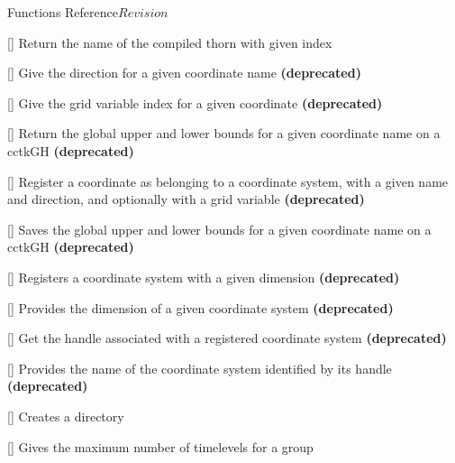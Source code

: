 \begin{cactuspart}{ Functions Reference}{}{$Revision$}
\begin{Lentry}
\item[\code{CCTK\_CompiledThorn}] [\pageref{CCTK-CompiledThorn}]
  Return the name of the compiled thorn with given index

\item[\code{CCTK\_CoordDir}] [\pageref{CCTK-CoordDir}]
  Give the direction for a given coordinate name \textbf{(deprecated)}

\item[\code{CCTK\_CoordIndex}] [\pageref{CCTK-CoordIndex}]
  Give the grid variable index for a given coordinate \textbf{(deprecated)}

\item[\code{CCTK\_CoordRange}] [\pageref{CCTK-CoordRange}]
  Return the global upper and lower bounds for a given coordinate name
  on a cctkGH \textbf{(deprecated)}

\item[\code{CCTK\_CoordRegisterData}] [\pageref{CCTK-CoordRegisterData}]
  Register a coordinate as belonging to a coordinate system,
  with a given name and direction, and optionally with a grid variable
  \textbf{(deprecated)}

\item[\code{CCTK\_CoordRegisterRange}] [\pageref{CCTK-CoordRegisterRange}]
  Saves the global upper and lower bounds for a given coordinate name
  on a cctkGH \textbf{(deprecated)}

\item[\code{CCTK\_CoordRegisterSystem}] [\pageref{CCTK-CoordRegisterSystem}]
  Registers a coordinate system with a given dimension \textbf{(deprecated)}

\item[\code{CCTK\_CoordSystemDim}] [\pageref{CCTK-CoordDim}]
  Provides the dimension of a given coordinate system \textbf{(deprecated)}

\item[\code{CCTK\_CoordSystemHandle}] [\pageref{CCTK-CoordSystemHandle}]
  Get the handle associated with a registered coordinate system
  \textbf{(deprecated)}

\item[\code{CCTK\_CoordSystemName}] [\pageref{CCTK-CoordSystemName}]
  Provides the name of the coordinate system identified by its handle
  \textbf{(deprecated)}

\item[\code{CCTK\_CreateDirectory}] [\pageref{CCTK-CreateDirectory}]
  Creates a directory

\item[\code{CCTK\_DeclaredTimeLevels}] [\pageref{CCTK-DeclaredTimeLevels}]
  Gives the maximum number of timelevels for a group


\end{Lentry}
\end{cactuspart}
